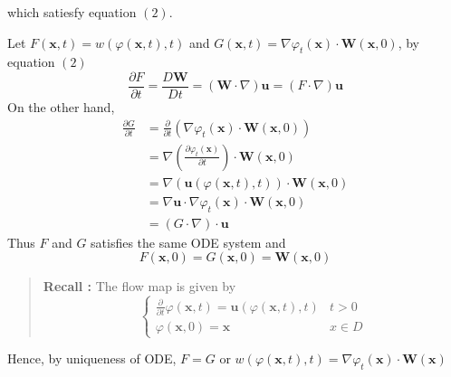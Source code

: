 which satiesfy equation $(2)$.


Let $F(\textbf{x},t) = w(\varphi(\textbf{x},t),t)$ and $G(\textbf{x},t) = \nabla \varphi_t(\textbf{x})\cdot\textbf{W}(\textbf{x},0)$, by equation $(2)$ 
\begin{equation}
\frac{\partial F}{\partial t} = \frac{D\textbf{W}}{Dt} = \left(\textbf{W}\cdot\nabla\right)\textbf{u} = \left(F\cdot\nabla\right)\textbf{u}
\end{equation}
On the other hand,
\begin{equation}
\begin{aligned}
\frac{\partial G}{\partial t}
&= \frac{\partial }{\partial t}\left(\nabla \varphi_t(\textbf{x})\cdot\textbf{W}(\textbf{x},0)\right) \\
&= \nabla \left(\frac{\partial \varphi_t(\textbf{x})}{\partial t}\right) \cdot \textbf{W}(\textbf{x},0)\\
&= \nabla \left(\textbf{u}\left(\varphi(\textbf{x},t),t\right)\right)\cdot\textbf{W}(\textbf{x},0)\\
&= \nabla \textbf{u} \cdot \nabla \varphi_t(\textbf{x}) \cdot \textbf{W}(\textbf{x},0)\\
&= \left(G\cdot\nabla\right)\cdot \textbf{u}
\end{aligned}
\end{equation}
Thus $F$ and $G$ satisfies the same ODE system and 
\begin{equation}
F(\textbf{x},0) = G(\textbf{x},0) = \textbf{W}(\textbf{x},0)
\end{equation}


\begin{quote}
	\textbf{Recall :}
The flow map is given by
\begin{equation}
\begin{cases} \displaystyle
\frac{\partial}{\partial t} \varphi (\textbf{x},t) = \textbf{u}\left(\varphi(\textbf{x},t),t\right) & t>0\\
\varphi(\textbf{x},0)=\textbf{x} & x\in D
\end{cases}
\end{equation}

\end{quote}
Hence, by uniqueness of ODE, $F = G$ or $w\left(\varphi(\textbf{x},t),t\right) = \nabla \varphi_t(\textbf{x}) \cdot \textbf{W} (\textbf{x})$


